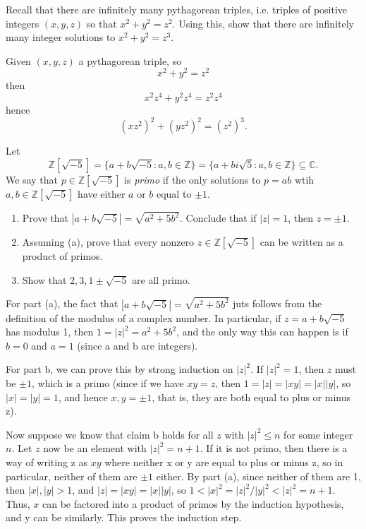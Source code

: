 \documentclass[11pt,dvipsnames]{book}
\def\Z{\mathbb{Z}}
\def\C{{\mathbb{C}}}
\numberwithin{figure}{section} %
\numberwithin{table}{section} %
\begin{document}
\begin{exercise}
Recall that there are infinitely many pythagorean triples, i.e. triples of positive integers $(x,y,z)$ so that $x^2+y^2=z^2$. Using this, show that there are infinitely many integer solutions to $x^2+y^2=z^3$.

\begin{solution}
Given $(x,y,z)$ a pythagorean triple, so
\[
x^2+y^2=z^2\]
then
\[
x^2z^4+ y^2 z^4 = z^2 z^4
\]
hence
\[
(xz^2)^2+(yz^2)^2 = (z^2)^3.
\]
\end{solution}
\end{exercise}

\begin{exercise} Let
\[
\Z[\sqrt{-5}]=\{a+b\sqrt{-5}: a,b\in\Z\} = \{a+bi\sqrt{5}: a,b\in\Z\}\subseteq \C.
\]
We say that $p\in \Z[\sqrt{-5}]$ is {\it primo} if the only solutions to $p=ab$ wtih $a,b\in \Z[\sqrt{-5}]$ have either $a$ or $b$ equal to $\pm 1$.

 \begin{enumerate}[label=(\alph*)]
\item Prove that $|a+b\sqrt{-5}|=\sqrt{a^2+5b^2}$. Conclude that if $|z|=1$, then $z=\pm 1$.
\item Assuming (a), prove that every nonzero $z\in\Z[\sqrt{-5}]$ can be written as a product of primos.
\item Show that $2,3,1\pm\sqrt{-5}$ are all primo.

\end{enumerate}

\begin{solution}
For part (a), the fact that $|a+b\sqrt{-5}|=\sqrt{a^{2}+5b^{2}}$ juts follows from the definition of the modulus of a complex number. In particular, if $z=a+b\sqrt{-5}$ has modulus 1, then $1=|z|^{2}=a^{2}+5b^{2}$, and the only way this can happen is if $b=0$ and $a=1$ (since a and b are integers).

For part b, we can prove this by strong induction on $|z|^2$. If $|z|^2=1$, then $z$ must be $\pm 1$, which is a primo (since if we have $xy=z$, then $1=|z|=|xy|=|x||y|$, so $|x|=|y|=1$, and hence $x,y=\pm 1$, that is, they are both equal to plus or minus z).

Now suppose we know that claim b holds for all $z$ with $|z|^2\leq n$ for some integer $n$. Let $z$ now be an element with $|z|^2=n+1$. If it is not primo, then there is a way of writing z as $xy$ where neither x or y are equal to plus or  minus z, so in particular, neither of them are $\pm 1$ either. By part (a), since neither of them are 1, then $|x|,|y|>1$, and $|z|=|xy|=|x||y|$, so $1<|x|^2=|z|^2/|y|^2<|z|^2=n+1$. Thus, $x$ can be factored into a product of primos by the induction hypothesis, and y can be similarly. This proves the induction step.


\end{solution}
\end{exercise}
\end{document}
